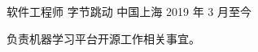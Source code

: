 

\begin{cventries}

  \cventry
  {软件工程师} %
  {字节跳动} %
  {中国上海} %
  {2019 年 3 月至今} %
  {
    \begin{cvitems} %
      \item 负责机器学习平台开源工作相关事宜。
    \end{cvitems}
  }


\end{cventries}
